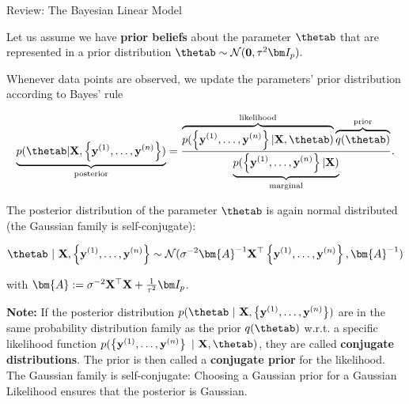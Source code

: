 \begin{vbframe}{Review: The Bayesian Linear Model}
\framebreak

Let us assume we have \textbf{prior beliefs} about the parameter $\thetab$ that are represented in a prior distribution $\thetab \sim \mathcal{N}(\zero, \tau^2 \id_p).$

\lz 

Whenever data points are observed, we update the parameters' prior distribution according to Bayes' rule 

$$
\underbrace{p(\thetab | \Xmat, \ydat)}_{\text{posterior}} = \frac{\overbrace{p(\ydat | \Xmat, \thetab)}^{\text{likelihood}}\overbrace{q(\thetab)}^{\text{prior}}}{\underbrace{p(\ydat|\Xmat)}_{\text{marginal}}}. 
$$

\framebreak 

The posterior distribution of the parameter $\thetab$ is again normal distributed (the Gaussian family is self-conjugate): 

$$
\thetab ~|~ \Xmat, \ydat \sim \mathcal{N}(\sigma^{-2}\bm{A}^{-1}\Xmat^\top\ydat, \bm{A}^{-1})
$$

with $\bm{A}:= \sigma^{-2}\Xmat^\top\Xmat + \frac{1}{\tau^2} \id_p$.

\lz 

\begin{footnotesize}
\textbf{Note:} If the posterior distribution $p(\thetab~|~\Xmat, \ydat)$ are in the same probability distribution family as the prior $q(\thetab)$ w.r.t. a specific likelihood function $p(\ydat~|~\Xmat, \thetab)$, they are called \textbf{conjugate distributions}. The prior is then called a \textbf{conjugate prior} for the likelihood. The Gaussian family is self-conjugate: Choosing a Gaussian prior for a Gaussian Likelihood ensures that the posterior is Gaussian. 
\end{footnotesize}

\framebreak 


\end{vbframe}
